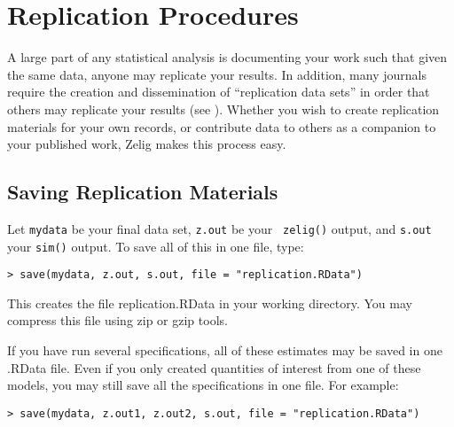 \begin{enumerate}
\end{enumerate}

\section{Replication Procedures} 

A large part of any statistical analysis is documenting your work such
that given the same data, anyone may replicate your results.  In
addition, many journals require the creation and dissemination of
``replication data sets'' in order that others may replicate your
results (see \nocite{King95}).
Whether you wish to create replication materials for your own records,
or contribute data to others as a companion to your published work,
Zelig makes this process easy.

\subsection{Saving Replication Materials}

Let {\tt mydata} be your final data set, {\tt z.out} be your {\tt
  zelig()} output, and {\tt s.out} your {\tt sim()} output.  To save
all of this in one file, type:
\begin{verbatim}
> save(mydata, z.out, s.out, file = "replication.RData")
\end{verbatim}
This creates the file replication.RData in your working directory.
You may compress this file using zip or gzip tools.

If you have run several specifications, all of these estimates may be
saved in one .RData file.  Even if you only created quantities of
interest from one of these models, you may still save all the
specifications in one file.  For example:
\begin{verbatim}
> save(mydata, z.out1, z.out2, s.out, file = "replication.RData")
\end{verbatim}

